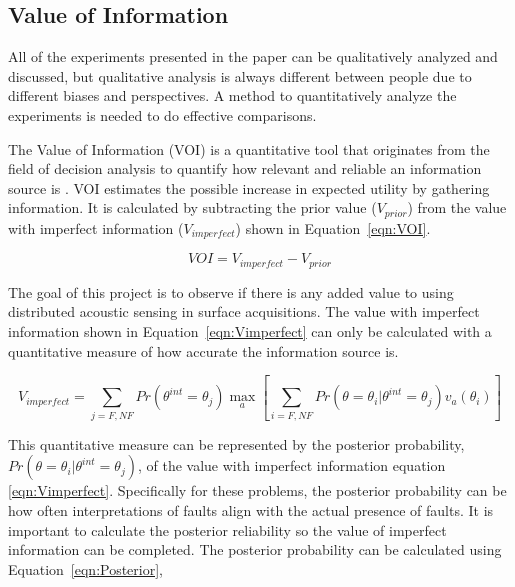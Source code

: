 
\subsection{Value of Information}
All of the experiments presented in the paper can be qualitatively analyzed and discussed, but qualitative analysis is always different between people due to different biases and perspectives. A method to quantitatively analyze the experiments is needed to do effective comparisons.

The Value of Information (VOI) is a quantitative tool that originates from the field of decision analysis to quantify how relevant and reliable an information source is \citep{trainor2013value}. VOI estimates the possible increase in expected utility by gathering information. It is calculated by subtracting the prior value ($V_{prior}$) from the value with imperfect information ($V_{imperfect}$) shown in  Equation~\ref{eqn:VOI}.

\begin{equation}
  VOI=V_{imperfect}-V_{prior}
\label{eqn:VOI}
\end{equation}

The goal of this project is to observe if there is any added value to using distributed acoustic sensing in surface acquisitions. The value with imperfect information shown in Equation~\ref{eqn:Vimperfect} can only be calculated with a quantitative measure of how accurate the information source is.

\begin{equation}
V_{imperfect} = \sum_{j=F,NF} Pr(\theta^{int}=\theta_j)  {\max_a [\sum_{i=F,NF} Pr(\theta=\theta_i | \theta^{int}=\theta_j)v_a(\theta_i)]}
\label{eqn:Vimperfect}
\end{equation}

This quantitative measure can be represented by the posterior probability, $Pr(\theta=\theta_i | \theta^{int}=\theta_j)$, of the value with imperfect information equation \ref{eqn:Vimperfect}. Specifically for these problems, the posterior probability can be how often interpretations of faults align with the actual presence of faults. It is important to calculate the posterior reliability so the value of imperfect information can be completed. The posterior probability can be calculated using Equation~\ref{eqn:Posterior},

